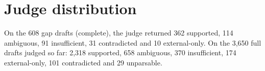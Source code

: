\documentclass[11pt]{article}
\begin{document}
\section{Judge distribution}
\label{app:judge}
On the 608 gap drafts (complete), the judge returned 362 supported, 114 ambiguous, 91 insufficient, 31 contradicted and 10 external-only. On the 3,650 full drafts judged so far: 2,318 supported, 658 ambiguous, 370 insufficient, 174 external-only, 101 contradicted and 29 unparsable.
\end{document}
